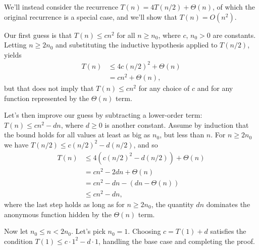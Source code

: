 We'll instead consider the recurrence $T(n)=4T(n/2)+\Theta(n)$, of which the original recurrence is a special case, and we'll show that $T(n)=O(n^2)$.

Our first guess is that $T(n)\le cn^2$ for all $n\ge n_0$, where $c$, $n_0>0$ are constants.
Letting $n\ge2n_0$ and substituting the inductive hypothesis applied to $T(n/2)$, yields
\begin{align*}
    T(n) &\le 4c(n/2)^2+\Theta(n) \\
    &= cn^2+\Theta(n),
\end{align*}
but that does not imply that $T(n)\le cn^2$ for any choice of $c$ and for any function represented by the $\Theta(n)$ term.

Let's then improve our guess by subtracting a lower-order term: $T(n)\le cn^2-dn$, where $d\ge0$ is another constant.
Assume by induction that the bound holds for all values at least as big as $n_0$, but less than $n$.
For $n\ge2n_0$ we have $T(n/2)\le c(n/2)^2-d(n/2)$, and so
\begin{align*}
    T(n) &\le 4(c(n/2)^2-d(n/2))+\Theta(n) \\
    &= cn^2-2dn+\Theta(n) \\
    &= cn^2-dn-(dn-\Theta(n)) \\
    &\le cn^2-dn,
\end{align*}
where the last step holds as long as for $n\ge2n_0$, the quantity $dn$ dominates the anonymous function hidden by the $\Theta(n)$ term.

Now let $n_0\le n<2n_0$.
Let's pick $n_0=1$.
Choosing $c=T(1)+d$ satisfies the condition $T(1)\le c\cdot1^2-d\cdot1$, handling the base case and completing the proof.
